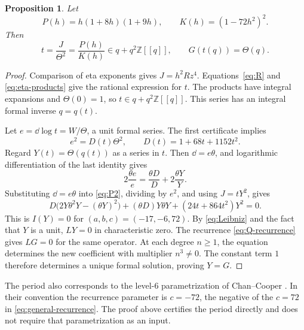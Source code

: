 \documentclass[11pt,a4paper]{article}
\newtheorem{proposition}[theorem]{Proposition}
\theoremstyle{remark}
\newcommand{\Z}{\mathbb Z}\newcommand{\Q}{\mathbb Q}
\begin{document}
\begin{proposition}\label{prop:period}
Let
\[
 P(h)=h(1+8h)(1+9h),\qquad K(h)=(1-72h^2)^2.
\]
Then
\begin{equation}\label{eq:parameter}
 t=\frac{J}{\Theta^2}=\frac{P(h)}{K(h)}
   \in q+q^2\Z[[q]],\qquad G(t(q))=\Theta(q).
\end{equation}
\end{proposition}
\begin{proof}
Comparison of eta exponents gives $J=h^2Rz^4$.
Equations~\eqref{eq:R} and \eqref{eq:eta-products} give the rational
expression for $t$. The products have integral expansions and
$\Theta(0)=1$, so $t\in q+q^2\Z[[q]]$.
This series has an integral formal inverse $q=q(t)$.

Let $e=\dd\log t=W/\Theta$, a unit formal series.
The first certificate implies
\[
 e^2=D(t)\Theta^2,\qquad D(t)=1+68t+1152t^2.
\]
Regard $Y(t)=\Theta(q(t))$ as a series in $t$.
Then $\dd=e\theta$, and logarithmic differentiation of the last
identity gives
\[
 2\frac{\theta e}{e}=\frac{\theta D}{D}
                       +2\frac{\theta Y}{Y}.
\]
Substituting $\dd=e\theta$ into \eqref{eq:P2}, dividing by $e^2$,
and using $J=tY^2$, gives
\[
 D\bigl(2Y\theta^2Y-(\theta Y)^2\bigr)
 +(\theta D)Y\theta Y+(24t+864t^2)Y^2=0.
\]
This is $I(Y)=0$ for $(a,b,c)=(-17,-6,72)$.
By \eqref{eq:Leibniz} and the fact that $Y$ is a unit,
$LY=0$ in characteristic zero.
The recurrence \eqref{eq:Q-recurrence} gives $LG=0$ for the same
operator. At each degree $n\ge1$, the equation determines the new
coefficient with multiplier $n^3\ne0$. The constant term $1$
therefore determines a unique formal solution, proving $Y=G$.
\end{proof}

The period also corresponds to the level-$6$ parametrization of
Chan--Cooper \cite{chancooper}. In their convention the recurrence
parameter is $c=-72$, the negative of the $c=72$ in
\eqref{eq:general-recurrence}. The proof above certifies the period
directly and does not require that parametrization as an input.
\end{document}
